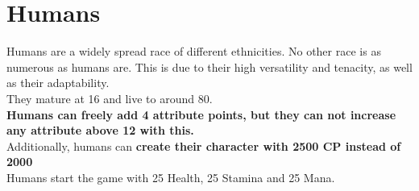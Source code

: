 \section{Humans}
Humans are a widely spread race of different ethnicities. No other race is as numerous as humans are. This is due to their high versatility and tenacity, as well as their adaptability.\\
They mature at 16 and live to around 80.\\
\textbf{Humans can freely add 4 attribute points, but they can not increase any attribute above 12 with this.}\\
Additionally, humans can \textbf{create their character with 2500 CP instead of 2000}\\ 
Humans start the game with 25 Health, 25 Stamina and 25 Mana.\\